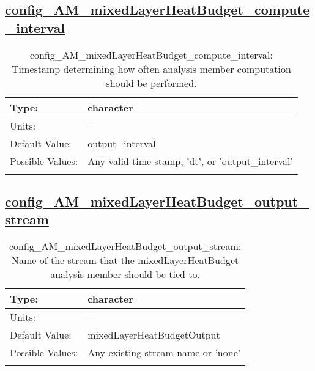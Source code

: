 \subsection[config\_AM\_mixedLayerHeatBudget\_compute\_interval]{\hyperref[sec:nm_tab_AM_mixedLayerHeatBudget]{config\_AM\_mixedLayerHeatBudget\_compute\_interval}}
\label{subsec:nm_sec_config_AM_mixedLayerHeatBudget_compute_interval}
\begin{center}
\begin{longtable}{| p{2.0in} || p{4.0in} |}
    \hline
    Type: & character \\
    \hline
    Units: & -- \\
    \hline
    Default Value: & output\_interval \\
    \hline
    Possible Values: & Any valid time stamp, 'dt', or 'output\_interval' \\
    \hline
    \caption{config\_AM\_mixedLayerHeatBudget\_compute\_interval: Timestamp determining how often analysis member computation should be performed.}
\end{longtable}
\end{center}
\subsection[config\_AM\_mixedLayerHeatBudget\_output\_stream]{\hyperref[sec:nm_tab_AM_mixedLayerHeatBudget]{config\_AM\_mixedLayerHeatBudget\_output\_stream}}
\label{subsec:nm_sec_config_AM_mixedLayerHeatBudget_output_stream}
\begin{center}
\begin{longtable}{| p{2.0in} || p{4.0in} |}
    \hline
    Type: & character \\
    \hline
    Units: & -- \\
    \hline
    Default Value: & mixedLayerHeatBudgetOutput \\
    \hline
    Possible Values: & Any existing stream name or 'none' \\
    \hline
    \caption{config\_AM\_mixedLayerHeatBudget\_output\_stream: Name of the stream that the mixedLayerHeatBudget analysis member should be tied to.}
\end{longtable}
\end{center}
